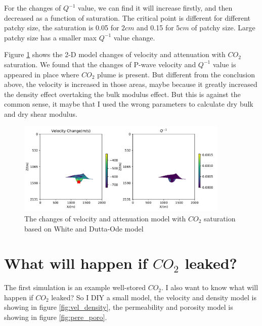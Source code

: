 For the changes of $Q^{-1}$ value, we can find it will increase firstly, and then decreased as a function of saturation.
The critical point is different for different patchy size, the saturation is 0.05 for $2 cm$ and 0.15 for $5 cm$ of patchy size.
Large patchy size has a smaller max $Q^{-1}$ value change.

Figure \ref{fig:V_change2Q} shows the 2-D model changes of velocity and attenuation with $CO_2$  saturation.
We found that the changes of P-wave velocity and $Q^{-1}$ value is appeared in place 
where $CO_2$ plume is present. 
But different from the conclusion above, the velocity is increased in those areas, maybe because
it greatly increased the density effect overtaking the bulk modulus effect. 
But this is against the common sense, it maybe that I used the wrong parameters to calculate 
dry bulk and dry shear modulus.

\begin{figure}[H]
    \centering
    \includegraphics[width=0.9\textwidth]{figures/project/V_change2Q.pdf}
    \caption{The changes of velocity and attenuation model with $CO_2$  saturation based on White and Dutta-Ode model}
    \label{fig:V_change2Q}
\end{figure}





\section{What will happen if $CO_2$ leaked?}

The first simulation is an example well-stored $CO_2$. I also want to know what will happen
if $CO_2$ leaked? So I DIY a small model, the velocity and density model is showing in figure \ref{fig:vel_density},
the permeability and porosity model is showing in figure \ref{fig:pere_poro}.

